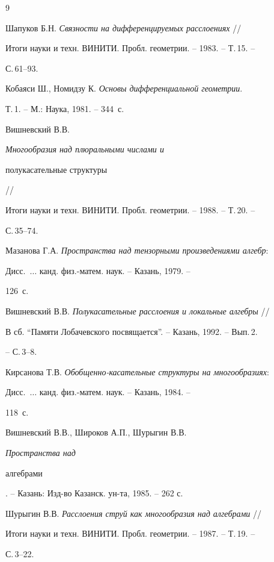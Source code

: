\begin{thebibliography}{9}







Шапуков Б.Н. {\em Связности на дифференцируемых расслоениях} //


Итоги науки и техн. ВИНИТИ. Пробл. геометрии. -- 1983. -- Т.\,15. --


С.\,61--93.




Кобаяси Ш., Номидзу К. {\em Основы дифференциальной геометрии}.


Т.\,1. -- М.: Наука, 1981. -- 344~с.




Вишневский В.В. {\em Многообразия над плюральными числами и


полукасательные структуры} //


Итоги науки и техн. ВИНИТИ. Пробл. геометрии. -- 1988. -- Т.\,20. --


С.\,35--74.




Мазанова Г.А. {\em Пространства над тензорными произведениями алгебр}:


Дисс.~$\dotsc$ канд. физ.-матем. наук. -- Казань, 1979. --


126~с.




Вишневский В.В. {\em Полукасательные расслоения и локальные алгебры} //


В сб. ``Памяти Лобачевского посвящается''. -- Казань, 1992. -- Вып.\,2.


-- С.\,3--8.




Кирсанова Т.В. {\em Обобщенно-касательные структуры на многообразиях}:


Дисс.~$\dotsc$ канд. физ.-матем. наук. -- Казань, 1984. --


118~с.




Вишневский В.В., Широков А.П., Шурыгин В.В. {\em Пространства над


алгебрами}. -- Казань: Изд-во Казанск. ун-та, 1985. -- 262 с.




Шурыгин В.В. {\em Расслоения струй как многообразия над алгебрами} //


Итоги науки и техн. ВИНИТИ. Пробл. геометрии. -- 1987. -- Т.\,19. --


С.\,3--22.








\end{thebibliography}





\vskip 1cm












\label{end}





